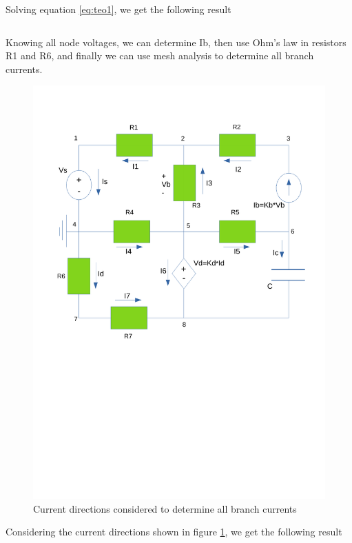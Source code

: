 \par Solving equation \ref{eq:teo1}, we get the following result

\begin{table}[h!]
\centering
\begin{tabularx}{0.6\textwidth} {
  | >{\raggedright\arraybackslash}X
  | >{\raggedleft\arraybackslash}X | }
 \hline
 
\end{tabularx}
\end{table}

\par Knowing all node voltages, we can determine Ib, then use Ohm's law in resistors R1 and R6, and finally we can use mesh analysis to determine all branch currents.

\begin{figure}[h!] \centering
\includegraphics[width=0.6\linewidth]{Esquema1_currents_teo.pdf}
\caption{Current directions considered to determine all branch currents}
\label{fig:Esquema1_currents_teo}
\end{figure}

\par Considering the current directions shown in figure \ref{fig:Esquema1_currents_teo}, we get the following result

\begin{table}[h!]
\centering
\begin{tabularx}{0.6\textwidth} {
  | >{\raggedright\arraybackslash}X
  | >{\raggedleft\arraybackslash}X | }
 \hline
 
\end{tabularx}
\end{table}


	


